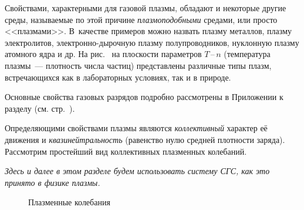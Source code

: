 Свойствами, характерными для газовой плазмы, обладают и некоторые другие среды,
называемые по этой причине \emph{плазмоподобными} средами, или просто <<плазмами>>.
В~качестве примеров можно назвать плазму металлов,
плазму электролитов, электронно-дырочную плазму полупроводников, 
нуклонную плазму атомного ядра и др.
На рис.~ на плоскости параметров
$T$\,--\,$n$ (температура плазмы~--- плотность числа частиц) 
представлены различные типы плазм, встречающихся как в лабораторных условиях,
так и в природе.


Основные свойства газовых разрядов подробно рассмотрены
в Приложении к разделу (см. стр.~\pageref{sec:discharge}).

\label{sec:plasma}

Определяющими свойствами плазмы являются \emph{коллективный} характер её движения
и \emph{квазинейтральность} (равенство нулю средней плотности заряда).
Рассмотрим простейший вид коллективных плазменных колебаний. 

\emph{Здесь и далее
в этом разделе будем использовать систему СГС, как это принято в физике плазмы.}


\begin{wrapfigure}{o}{0.45\textwidth}
    \centering
    \caption{Плазменные колебания}
\end{wrapfigure}


